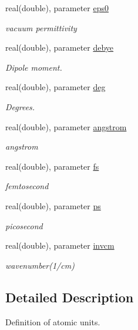 \begin{DoxyCompactItemize}
real(double), parameter \hyperlink{namespaceatomicunits_a45821c6127c356d71ba94bf34b962653}{eps0}
\begin{DoxyCompactList}\small\item\em vacuum permittivity \end{DoxyCompactList}\item 
real(double), parameter \hyperlink{namespaceatomicunits_af82c72bfababde1e5da6ac04a43b8570}{debye}
\begin{DoxyCompactList}\small\item\em Dipole moment. \end{DoxyCompactList}\item 
real(double), parameter \hyperlink{namespaceatomicunits_af9552fc54f3050b11cce6152261c2bf2}{deg}
\begin{DoxyCompactList}\small\item\em Degrees. \end{DoxyCompactList}\item 
real(double), parameter \hyperlink{namespaceatomicunits_a618f9dcd7de9b9ddb53af5bd4f1095c6}{angstrom}
\begin{DoxyCompactList}\small\item\em angstrom \end{DoxyCompactList}\item 
real(double), parameter \hyperlink{namespaceatomicunits_a51f9c61f64f3aec674dd6dbb342e733d}{fs}
\begin{DoxyCompactList}\small\item\em femtosecond \end{DoxyCompactList}\item 
real(double), parameter \hyperlink{namespaceatomicunits_af5dac3bb123ac05a538d6ebd2373eb3b}{ps}
\begin{DoxyCompactList}\small\item\em picosecond \end{DoxyCompactList}\item 
real(double), parameter \hyperlink{namespaceatomicunits_a1741cd0f8cdd696033c1c18531740795}{invcm}
\begin{DoxyCompactList}\small\item\em wavenumber(1/cm) \end{DoxyCompactList}\end{DoxyCompactItemize}


\subsection{Detailed Description}
Definition of atomic units. 

